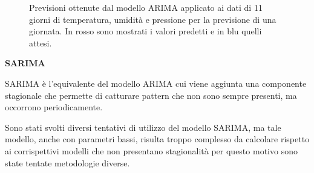 \documentclass{article}
\begin{document}
\begin{figure}
    \centering
    \qquad
    \qquad
    \caption{Previsioni ottenute dal modello ARIMA applicato ai dati di 11 giorni di temperatura, umidità e pressione per la previsione
    di una giornata. In rosso sono mostrati i valori predetti e in blu quelli attesi.}
    \label{fig:arima}
\end{figure}

\bigskip
\textbf{SARIMA}
\medskip

SARIMA è l'equivalente del modello ARIMA cui viene aggiunta una componente stagionale che permette di catturare pattern che non sono sempre presenti, ma occorrono periodicamente.

Sono stati svolti diversi tentativi di utilizzo del modello SARIMA, ma tale modello, anche con parametri bassi, risulta troppo complesso da calcolare rispetto ai corrispettivi modelli che non presentano stagionalità per questo motivo sono state tentate metodologie diverse. 
\end{document}
